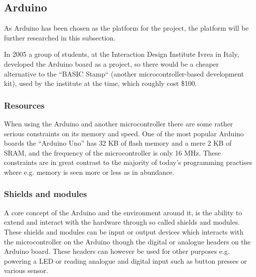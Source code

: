 \subsection{Arduino}

As Arduino has been chosen as the platform for the project, the platform will be further researched in this subsection.

\begin{tcolorbox}[floatplacement=b,float,colback=white!5,colframe=aaublue!50,title=The Birth of the Arduino]
In 2005 a group of students, at the Interaction Design Institute Ivrea in Italy, developed the Arduino board as a project, so there would be a cheaper alternative to the ``BASIC Stamp`` (another microcontroller-based development kit), used by the institute at the time, which roughly cost \$100. \cite{birthofarduino}
\end{tcolorbox}

\subsubsection{Resources}
When using the Arduino and another microcontroller there are some rather serious constraints on its memory and speed.
One of the most popular Arduino boards the ``Arduino Uno'' has 32 KB of flash memory and a mere 2 KB of SRAM, and the frequency of the microcontroller is only 16 MHz.
These constraints are in great contrast to the majority of today's programming practises where e.g. memory is seen more or less as in abundance. 
\subsubsection{Shields and modules}
A core concept of the Arduino and the environment around it, is the ability to extend and interact with the hardware through so called shields and modules.
These shields and modules can be input or output devices which interacts with the microcontroller on the Arduino though the digital or analogue headers on the Arduino board.
These headers can however be used for other purposes e.g. powering a LED or reading analogue and digital input such as button presses or various sensor.

